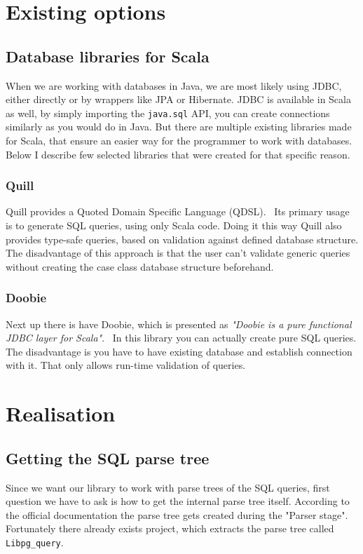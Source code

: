 \documentclass[thesis=B,english]{FITthesis}[2019/12/23]
\begin{document}
\chapter{Existing options}
\section{Database libraries for Scala}
When we are working with databases in Java, we are most likely using JDBC, either directly or by wrappers like JPA or Hibernate. JDBC is available in Scala as well, by simply importing the \texttt{java.sql} API, you can create connections similarly as you would do in Java. But there are multiple existing libraries made for Scala, that ensure an easier way for the programmer to work with databases. Below I describe few selected libraries that were created for that specific reason.


\subsection{Quill}
Quill provides a Quoted Domain Specific Language (QDSL).~\cite{Quill} Its primary usage is to generate SQL queries, using only Scala code. Doing it this way Quill also provides type-safe queries, based on validation against defined database structure. The disadvantage of this approach is that the user can't validate generic queries without creating the case class database structure beforehand.

\subsection{Doobie}
Next up there is have Doobie, which is presented as \textit{"Doobie is a pure functional JDBC layer for Scala"}.~\cite{Doobie} In this library you can actually create pure SQL queries. The disadvantage is you have to have existing database and establish connection with it. That only allows run-time validation of queries.

\chapter{Realisation}

\section{Getting the SQL parse tree}
Since we want our library to work with parse trees of the SQL queries, first question we have to ask is how to get the internal parse tree itself. According to the official documentation\cite{PostgreSQL documentation} the parse tree gets created during the "Parser stage". Fortunately there already exists project, which extracts the parse tree called \texttt{Libpg\_query}.
\end{document}
